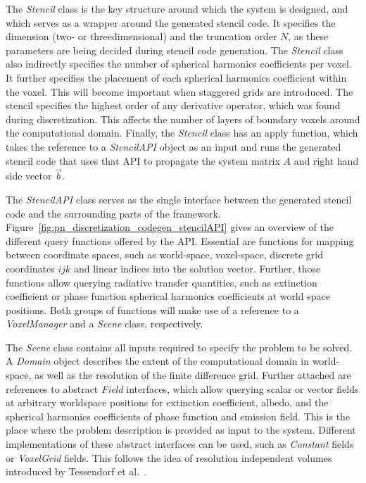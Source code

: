 The \emph{Stencil} class is the key structure around which the system is designed, and which serves as a wrapper around the generated stencil code. It specifies the dimension (two- or threedimensional) and the truncation order $N$, as these parameters are being decided during stencil code generation. The \emph{Stencil} class also indirectly specifies the number of spherical harmonics coefficients per voxel. It further specifies the placement of each spherical harmonics coefficient within the voxel. This will become important when staggered grids are introduced. The stencil specifies the highest order of any derivative operator, which was found during discretization. This affects the number of layers of boundary voxels around the computational domain. Finally, the \emph{Stencil} class has an apply function, which takes the reference to a \emph{StencilAPI} object as an input and runs the generated stencil code that uses that API to propagate the system matrix $A$ and right hand side vector $\vec{b}$.

The \emph{StencilAPI} class serves as the single interface between the generated stencil code and the surrounding parts of the framework. Figure~\ref{fig:pn_discretization_codegen_stencilAPI} gives an overview of the different query functions offered by the API. Essential are functions for mapping between coordinate spaces, such as world-space, voxel-space, discrete grid coordinates $ijk$ and linear indices into the solution vector. Further, those functions allow querying radiative transfer quantities, such as extinction coefficient or phase function spherical harmonics coefficients at world space positions. Both groups of functions will make use of a reference to a \emph{VoxelManager} and a \emph{Scene} class, respectively.

The \emph{Scene} class contains all inputs required to specify the problem to be solved. A \emph{Domain} object describes the extent of the computational domain in world-space, as well as the resolution of the finite difference grid. Further attached are references to abstract \emph{Field} interfaces, which allow querying scalar or vector fields at arbitrary worldspace positions for extinction coefficient, albedo, and the spherical harmonics coefficients of phase function and emission field. This is the place where the problem description is provided as input to the system. Different implementations of these abstract interfaces can be used, such as \emph{Constant} fields or \emph{VoxelGrid} fields. This follows the idea of resolution independent volumes introduced by Tessendorf et al.~\cite{Tessendorf11}.


